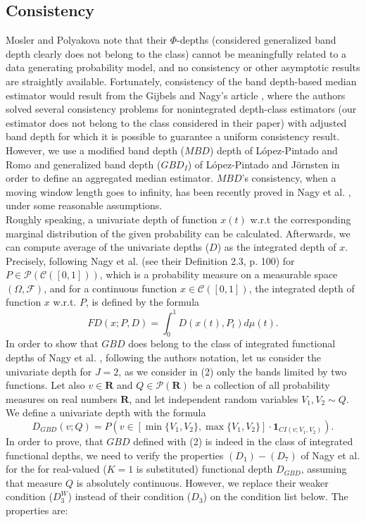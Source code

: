 \documentclass[12pt,a4paper]{article}
\numberwithin{equation}{section}
\begin{document}
\subsection{Consistency}
Mosler and Polyakova \cite{MoslerPolyakova} note that their $\Phi$-depths (considered generalized band depth clearly does not belong to the class) cannot be meaningfully related to a data generating probability model, and no consistency or other asymptotic results are straightly available.
Fortunately, consistency of the band depth-based median estimator would result from the Gijbels and Nagy's article \cite{gijbels_nagy}, where the authors solved several consistency problems for nonintegrated depth-class estimators (our estimator does not belong to the class considered in their paper) with adjusted band depth for which it is possible to guarantee a uniform consistency result.
\\ However, we use a modified band depth ($MBD$) depth of L\'opez-Pintado and Romo \cite{LopezRomo} and
generalized band depth ($GBD_I$) of L\'opez-Pintado and J\"ornsten \cite{Lopez} in order to define an aggregated median estimator. $MBD$'s consistency, when a moving window length goes to infinity, has been recently proved in Nagy et al. \cite{Nagy}, under some reasonable assumptions. 
\\Roughly speaking, a univariate depth of function $x(t)$ w.r.t the corresponding marginal distribution of the given probability can be calculated. Afterwards, we can compute average of the univariate depths ($D$) as the integrated depth of $x$. Precisely, following Nagy et al. \cite{Nagy} (see their Definition 2.3, p. 100) for $P\in \mathcal{P}(\mathcal{C}([0,1]))$, which is a probability measure on a measurable space $\left( \Omega, \mathcal{F}\right)$, and for a continuous function $x\in \mathcal{C}([0,1])$, the integrated depth of function $x$ w.r.t. $P$, is defined by the formula
$$FD(x;P,D)=\int_0^1D(x(t),P_t)d\mu(t).$$
In order to show that $GBD$ does belong to the class of integrated functional depths of Nagy et al. \cite{Nagy}, following the authors notation, let us consider the univariate depth for $J=2$, as we consider in (2) only the bands limited by two functions. Let also $v\in\mathbf{R}$ and $Q\in\mathcal{P}(\mathbf{R})$ be a collection of all probability measures on real numbers $\mathbf{R}$, and let independent random variables $V_1,V_2 \sim Q$. We define a univariate depth with the formula
$$D_{GBD}(v;Q)=P\left(v\in [\min \{V_1,V_2\}, \max \{V_1,V_2\}]\cdot \mathbf{1}_{CI(v;V_1,V_2)} \right).$$
In order to prove, that $GBD$ defined with (2) is indeed in the class of integrated functional depths, we need to verify the properties $(D_1)-(D_7)$ of Nagy et al. \cite{Nagy} for the for real-valued ($K = 1$ is substituted) functional depth $D_{GBD}$, assuming that measure $Q$ is absolutely continuous. However, we replace their weaker condition ($D_3^W$) instead of their condition ($D_3$) on the condition list below. The properties are:
\end{document}
